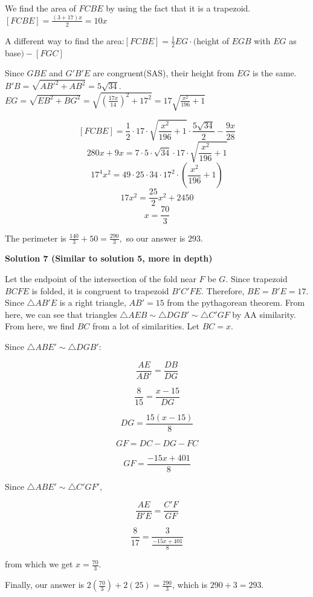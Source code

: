 \begin{enumerate}
 We find the area of $FCBE$ by using the fact that it is a trapezoid. $[FCBE]=\frac{(3+17)x}{2}=10x$

 A different way to find the area:$[FCBE]=\frac{1}{2} EG\cdot($height of $EGB$ with $EG$ as base$)-[FGC]$

 Since $GBE$ and $G'B'E$ are congruent(SAS), their height from $EG$ is the same. $B'B=\sqrt{AB'^2+AB^2}=5\sqrt{34}$.$EG=\sqrt{EB^2+BG^2}=\sqrt{(\frac{17x}{14})^2+17^2}=17\sqrt{\frac{x^2}{196}+1}$

 \[[FCBE]=\frac{1}{2} \cdot 17 \cdot \sqrt{\frac{x^2}{196}+1} \cdot \frac{5\sqrt{34}}{2}-\frac{9x}{28}\]
 \[280x+9x=7\cdot 5 \cdot \sqrt{34} \cdot 17 \cdot \sqrt{\frac{x^2}{196}+1}\]
 \[17^4 x^2=49 \cdot 25 \cdot 34 \cdot 17^2 \cdot (\frac{x^2}{196}+1)\]
 \[17x^2=\frac{25}{2}x^2+2450\]
 \[x=\frac{70}{3}\]

 The perimeter is $\frac{140}{3}+50=\frac{290}{3},$ so our answer is $\boxed{293}$.

 



\textbf{Solution 7 (Similar to solution 5, more in depth)}

Let the endpoint of the intersection of the fold near $F$ be $G$. Since trapezoid $BCFE$ is folded, it is congruent to trapezoid $B'C'FE$. Therefore, $BE=B'E=17$. Since $\triangle AB'E$ is a right triangle, $AB'=15$ from the pythagorean theorem. From here, we can see that triangles $\triangle AEB \sim \triangle DGB' \sim \triangle C'GF$ by AA similarity. From here, we find $BC$ from a lot of similarities. Let $BC=x$.

 Since $\triangle ABE' \sim \triangle DGB'$:

 
 \[\frac {AE}{AB'} = \frac{DB}{DG}\]

 \[\frac {8}{15} = \frac {x-15}{DG}\]

 \[DG = \frac {15(x-15)}{8}\]

 \[GF = DC-DG-FC\]

 \[GF = \frac{-15x+401}{8}\]

 Since $\triangle ABE' \sim \triangle C'GF'$,

 
 \[\frac {AE}{B'E} = \frac {C'F}{GF}\]

 \[\frac {8}{17} = \frac{3}{\frac {-15x+401}{8}}\]

 from which we get $x= \frac {70}{3}$.

 Finally, our answer is $2(\frac {70}{3}) + 2(25)=\frac {290}{3}$, which is $290+3=\boxed{293}$.

 



\end{enumerate}
